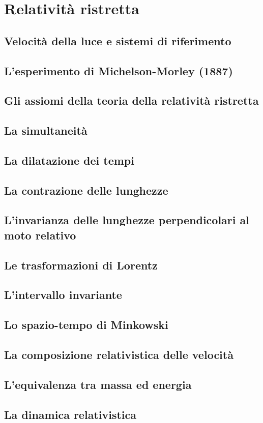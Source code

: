 
\section{Relatività ristretta}

\subsection{Velocità della luce e sistemi di riferimento}

\subsection{L'esperimento di Michelson-Morley (1887)}

\subsection{Gli assiomi della teoria della relatività ristretta}

\subsection{La simultaneità}

\subsection{La dilatazione dei tempi}

\subsection{La contrazione delle lunghezze}

\subsection{L'invarianza delle lunghezze perpendicolari al moto relativo}

\subsection{Le trasformazioni di Lorentz}

\subsection{L'intervallo invariante}

\subsection{Lo spazio-tempo di Minkowski}

\subsection{La composizione relativistica delle velocità}

\subsection{L'equivalenza tra massa ed energia}

\subsection{La dinamica relativistica}
